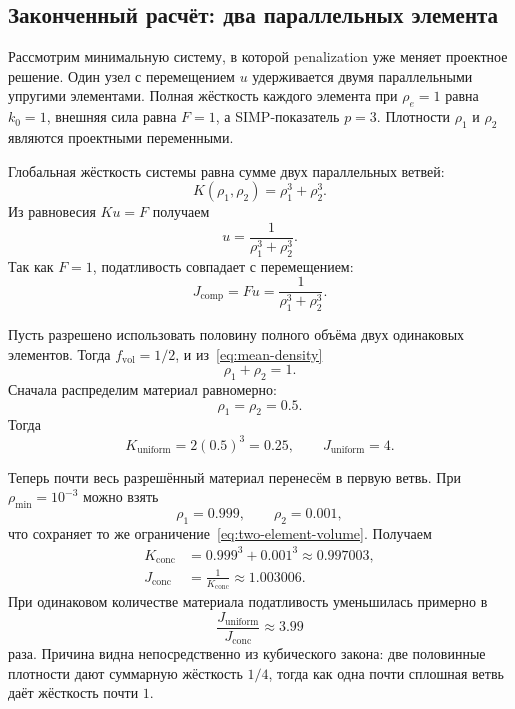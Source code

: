 \subsection{Законченный расчёт: два параллельных элемента}

Рассмотрим минимальную систему, в которой penalization уже меняет проектное решение. Один узел с перемещением $u$ удерживается двумя параллельными упругими элементами. Полная жёсткость каждого элемента при $\rho_e=1$ равна $k_0=1$, внешняя сила равна $F=1$, а SIMP-показатель $p=3$. Плотности $\rho_1$ и $\rho_2$ являются проектными переменными.

Глобальная жёсткость системы равна сумме двух параллельных ветвей:
\begin{equation}
 K(\rho_1,\rho_2)
 =\rho_1^3+\rho_2^3.
\end{equation}
Из равновесия $Ku=F$ получаем
\begin{equation}
 u
 =
 \frac{1}{\rho_1^3+\rho_2^3}.
\end{equation}
Так как $F=1$, податливость совпадает с перемещением:
\begin{equation}
 J_{\mathrm{comp}}
 =Fu
 =
 \frac{1}{\rho_1^3+\rho_2^3}.
\end{equation}

Пусть разрешено использовать половину полного объёма двух одинаковых элементов. Тогда $f_{\mathrm{vol}}=1/2$, и из~\eqref{eq:mean-density}
\begin{equation}
\label{eq:two-element-volume}
 \rho_1+\rho_2=1.
\end{equation}
Сначала распределим материал равномерно:
\begin{equation}
 \rho_1=\rho_2=0.5.
\end{equation}
Тогда
\begin{equation}
 K_{\mathrm{uniform}}
 =2(0.5)^3
 =0.25,
 \qquad
 J_{\mathrm{uniform}}=4.
\end{equation}

Теперь почти весь разрешённый материал перенесём в первую ветвь. При $\rho_{\min}=10^{-3}$ можно взять
\begin{equation}
 \rho_1=0.999,
 \qquad
 \rho_2=0.001,
\end{equation}
что сохраняет то же ограничение~\eqref{eq:two-element-volume}. Получаем
\begin{equation}
 \begin{aligned}
 K_{\mathrm{conc}}
 &=0.999^3+0.001^3
 \approx0.997003,\\
 J_{\mathrm{conc}}
 &=\frac{1}{K_{\mathrm{conc}}}
 \approx1.003006.
 \end{aligned}
\end{equation}
При одинаковом количестве материала податливость уменьшилась примерно в
\begin{equation}
 \frac{J_{\mathrm{uniform}}}{J_{\mathrm{conc}}}
 \approx3.99
\end{equation}
раза. Причина видна непосредственно из кубического закона: две половинные плотности дают суммарную жёсткость $1/4$, тогда как одна почти сплошная ветвь даёт жёсткость почти $1$.

